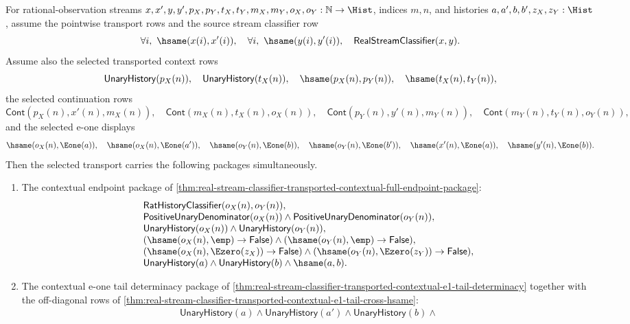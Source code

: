 \begin{theorem}
\label{thm:real-selected-transport-fit-synchronized-package}
For rational-observation streams
$x,x',y,y',p_X,p_Y,t_X,t_Y,m_X,m_Y,o_X,o_Y:\mathbb{N}\to\Hist$,
indices $m,n$, and histories $a,a',b,b',z_X,z_Y:\Hist$, assume the pointwise
transport rows and the source stream classifier row
$$
\forall i,\ \hsame(x(i),x'(i)),\quad
\forall i,\ \hsame(y(i),y'(i)),\quad
\mathsf{RealStreamClassifier}(x,y).
$$
Assume also the selected transported context rows
$$
\mathsf{UnaryHistory}(p_X(n)),\quad
\mathsf{UnaryHistory}(t_X(n)),\quad
\hsame(p_X(n),p_Y(n)),\quad
\hsame(t_X(n),t_Y(n)),
$$
the selected continuation rows
$$
\mathsf{Cont}(p_X(n),x'(n),m_X(n)),\quad
\mathsf{Cont}(m_X(n),t_X(n),o_X(n)),
\quad\mathsf{Cont}(p_Y(n),y'(n),m_Y(n)),\quad
\mathsf{Cont}(m_Y(n),t_Y(n),o_Y(n)),
$$
and the selected e-one displays
$$
\hsame(o_X(n),\Eone(a)),\quad
\hsame(o_X(n),\Eone(a')),\quad
\hsame(o_Y(n),\Eone(b)),\quad
\hsame(o_Y(n),\Eone(b')),\quad
\hsame(x'(n),\Eone(a)),\quad
\hsame(y'(n),\Eone(b)).
$$
Then the selected transport carries the following packages simultaneously.
\begin{enumerate}
\item The contextual endpoint package of
\autoref{thm:real-stream-classifier-transported-contextual-full-endpoint-package}:
$$
\begin{array}{l}
\mathsf{RatHistoryClassifier}(o_X(n),o_Y(n)),\\
\mathsf{PositiveUnaryDenominator}(o_X(n))\land
\mathsf{PositiveUnaryDenominator}(o_Y(n)),\\
\mathsf{UnaryHistory}(o_X(n))\land
\mathsf{UnaryHistory}(o_Y(n)),\\
(\hsame(o_X(n),\emp)\to\mathsf{False})\land
(\hsame(o_Y(n),\emp)\to\mathsf{False}),\\
(\hsame(o_X(n),\Ezero(z_X))\to\mathsf{False})\land
(\hsame(o_Y(n),\Ezero(z_Y))\to\mathsf{False}),\\
\mathsf{UnaryHistory}(a)\land\mathsf{UnaryHistory}(b)\land\hsame(a,b).
\end{array}
$$
\item The contextual e-one tail determinacy package of
\autoref{thm:real-stream-classifier-transported-contextual-e1-tail-determinacy}
together with the off-diagonal rows of
\autoref{thm:real-stream-classifier-transported-contextual-e1-tail-cross-hsame}:
$$
\begin{array}{l}
\mathsf{UnaryHistory}(a)\land
\mathsf{UnaryHistory}(a')\land
\mathsf{UnaryHistory}(b)\land

\end{array}$$
\end{enumerate}
\end{theorem}
